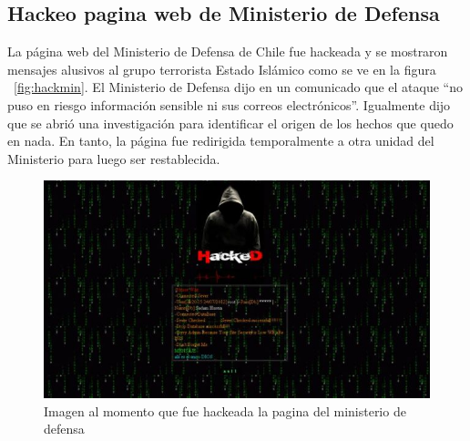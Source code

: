 \subsection{Hackeo pagina web de Ministerio de Defensa}
La página web del Ministerio de Defensa de Chile fue hackeada y se mostraron mensajes alusivos al grupo terrorista Estado Islámico como se ve en la figura 
~\ref{fig:hackmin}.
El Ministerio de Defensa dijo en un comunicado que el ataque “no puso en riesgo información sensible ni sus correos electrónicos”.
Igualmente dijo que se abrió una investigación para identificar el origen de los hechos que quedo en nada. En tanto, la página fue redirigida temporalmente a otra unidad del Ministerio para luego ser restablecida.
\begin{figure}[H]
\label{fig:hackmin}
\centering
\includegraphics[width=\textwidth]{img/ministeriohack.jpg}
\caption{Imagen al momento que fue hackeada la pagina del ministerio de defensa}
\label{fig:diagrama01}
\end{figure}
